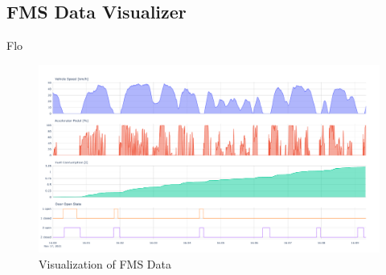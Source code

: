 \subsection{FMS Data Visualizer}
Flo 

\bigskip
\begin{figure}[h!]
	\centering
	\hfuzz=15.0pt
	\includegraphics[width=15cm]{images/FMS_Data_Visualization.pdf}
	\caption{Visualization of FMS Data}
	\label{fig:fms_visualization}
\end{figure}
\newpage
